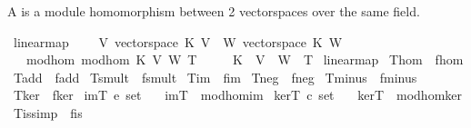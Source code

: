\begin{isabellebody}
\isamarkupfalse%
%
\endisatagproof
{\isafoldproof}%
%
\isadelimproof
%
\endisadelimproof
%
\begin{isamarkuptext}%
A  is a module homomorphism between 2 vectorspaces
over the same field.%
\end{isamarkuptext}%
\isamarkuptrue%
\isamarkupfalse%
\ linear{\isacharunderscore}map\ {\isacharequal}\ \isanewline
\ \ V{\isacharcolon}\ vectorspace\ K\ V\ {\isacharplus}\ W{\isacharcolon}\ vectorspace\ K\ W\isanewline
\ \ {\isacharplus}\ mod{\isacharunderscore}hom{\isacharcolon}\ mod{\isacharunderscore}hom\ K\ V\ W\ T\isanewline
\ \ \ \ \ K\ \ V\ \ W\ \ T\isanewline
\isanewline
{}\isamarkupfalse%
\ linear{\isacharunderscore}map\isanewline
{}\isanewline
{}\isamarkupfalse%
\ T{\isacharunderscore}hom\ {\isacharequal}\ f{\isacharunderscore}hom\isanewline
{}\isamarkupfalse%
\ T{\isacharunderscore}add\ {\isacharequal}\ f{\isacharunderscore}add\isanewline
{}\isamarkupfalse%
\ T{\isacharunderscore}smult\ {\isacharequal}\ f{\isacharunderscore}smult\isanewline
{}\isamarkupfalse%
\ T{\isacharunderscore}im\ {\isacharequal}\ f{\isacharunderscore}im\isanewline
{}\isamarkupfalse%
\ T{\isacharunderscore}neg\ {\isacharequal}\ f{\isacharunderscore}neg\isanewline
{}\isamarkupfalse%
\ T{\isacharunderscore}minus\ {\isacharequal}\ f{\isacharunderscore}minus\isanewline
{}\isamarkupfalse%
\ T{\isacharunderscore}ker\ {\isacharequal}\ f{\isacharunderscore}ker\isanewline
\isanewline
{}\isamarkupfalse%
\ imT{\isacharcolon}{\isacharcolon}\ {\isachardoublequoteopen}{\isacharprime}e\ set{\isachardoublequoteclose}\isanewline
\ \ \ {\isachardoublequoteopen}imT\ {\isasymequiv}\ mod{\isacharunderscore}hom{\isachardot}im{\isachardoublequoteclose}\isanewline
\isanewline
{}\isamarkupfalse%
\ kerT{\isacharcolon}{\isacharcolon}\ {\isachardoublequoteopen}{\isacharprime}c\ set{\isachardoublequoteclose}\isanewline
\ \ \ {\isachardoublequoteopen}kerT\ {\isasymequiv}\ mod{\isacharunderscore}hom{\isachardot}ker{\isachardoublequoteclose}\isanewline
\isanewline
{}\isamarkupfalse%
\ T{}{\isacharunderscore}is{\isacharunderscore}{}{\isacharbrackleft}simp{\isacharbrackright}\ {\isacharequal}\ f{}{\isacharunderscore}is{\isacharunderscore}{}\isanewline

\end{isabellebody}
